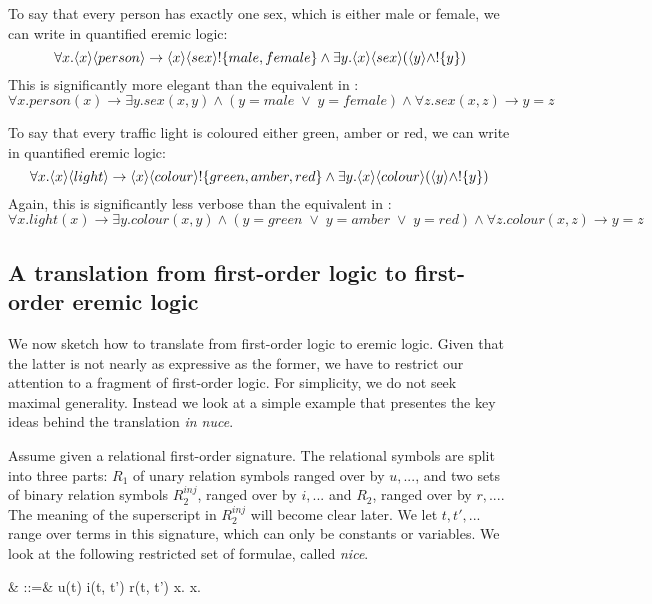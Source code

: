 To say that every person has exactly one sex, which is either male or female, we can write in quantified eremic logic:
\[
\forall x . \langle x \rangle \langle person \rangle \rightarrow \langle x \rangle \langle sex \rangle ! \{male, female\} \land \exists y . \langle x \rangle \langle sex \rangle (\langle y \rangle \land ! \{y\})
\]
This is significantly more elegant than the equivalent in \fol{}:
\[
\forall x. person(x) \rightarrow \exists y . sex(x,y) \land (y = male \; \lor \; y = female) \land \forall z . sex(x,z) \rightarrow y = z
\]

To say that every traffic light is coloured either green, amber or red, we can write in quantified eremic logic:
\[
\forall x. \langle x \rangle \langle light \rangle \rightarrow \langle x \rangle \langle colour \rangle !\{green, amber, red\} \land \exists y . \langle x \rangle \langle colour \rangle (\langle y \rangle \land !\{y\})
\]
Again, this is significantly less verbose than the equivalent in \fol{}:
\[
\forall x. light(x) \rightarrow \exists y . colour(x,y) \land (y = green \; \lor \; y = amber \; \lor \; y = red) \land \forall z . colour(x,z) \rightarrow y = z
\]

\subsection{A translation from first-order logic to first-order eremic logic}\label{translationFOLtoFOEL}

We now sketch how to translate from first-order logic to eremic
logic. Given that the latter is not nearly as expressive as the
former, we have to restrict our attention to a fragment of first-order
logic. For simplicity, we do not seek maximal generality. Instead we
look at a simple example that presentes the key ideas behind the
translation \emph{in nuce}.

Assume given a relational first-order signature. The relational
symbols are split into three parts: $R_1$ of unary relation symbols
ranged over by $u, ...$, and two sets of binary relation symbols
$R_2^{inj}$, ranged over by $i, ...$ and $R_2$, ranged over by $r,
...$. The meaning of the superscript in $R_2^{inj}$ will become clear
later.  We let $t, t', ...$ range over terms in this signature, which
can only be constants or variables. We look at the following
restricted set of formulae, called \emph{nice}.
\begin{GRAMMAR}
  \phi
     & \quad::=\quad &
  u(t) 
     \VERTICAL 
  i(t, t') 
     \VERTICAL 
  r(t, t') 
     \VERTICAL 
  \phi \AND \psi 
     \VERTICAL 
  \forall x.\phi 
     \VERTICAL 
  \exists x.\phi
\end{GRAMMAR}

